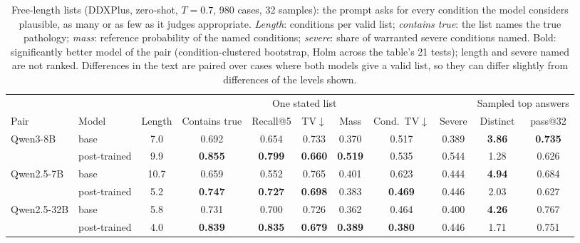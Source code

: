 \documentclass[11pt]{article}
\begin{document}
\begin{table}[t]
\centering\small
\setlength{\tabcolsep}{3.5pt}
\begin{adjustbox}{max width=\linewidth}
\begin{tabular}{llccccccccc}
\toprule
 & & \multicolumn{7}{c}{One stated list} & \multicolumn{2}{c}{Sampled top answers} \\
Pair & Model & Length & Contains true & Recall@5 & TV$\downarrow$ & Mass & Cond.\ TV$\downarrow$ & Severe & Distinct & pass@32 \\
\midrule
Qwen3-8B & base & 7.0 & 0.692 & 0.654 & 0.733 & 0.370 & 0.517 & 0.389 & \textbf{3.86} & \textbf{0.735} \\
 & post-trained & 9.9 & \textbf{0.855} & \textbf{0.799} & \textbf{0.660} & \textbf{0.519} & 0.535 & 0.544 & 1.28 & 0.626 \\
\midrule
Qwen2.5-7B & base & 10.7 & 0.659 & 0.552 & 0.765 & 0.401 & 0.623 & 0.444 & \textbf{4.94} & 0.684 \\
 & post-trained & 5.2 & \textbf{0.747} & \textbf{0.727} & \textbf{0.698} & 0.383 & \textbf{0.469} & 0.446 & 2.03 & 0.627 \\
\midrule
Qwen2.5-32B & base & 5.8 & 0.731 & 0.700 & 0.726 & 0.362 & 0.464 & 0.400 & \textbf{4.26} & 0.767 \\
 & post-trained & 4.0 & \textbf{0.839} & \textbf{0.835} & \textbf{0.679} & \textbf{0.389} & \textbf{0.380} & 0.446 & 1.71 & 0.751 \\
\bottomrule
\end{tabular}
\end{adjustbox}
\caption{Free-length lists (DDXPlus, zero-shot, $T{=}0.7$, 980 cases, 32 samples): the prompt asks for every condition the model considers plausible, as many or as few as it judges appropriate. \emph{Length}: conditions per valid list; \emph{contains true}: the list names the true pathology; \emph{mass}: reference probability of the named conditions; \emph{severe}: share of warranted severe conditions named. Bold: significantly better model of the pair (condition-clustered bootstrap, Holm across the table's 21 tests); length and severe named are not ranked. Differences in the text are paired over cases where both models give a valid list, so they can differ slightly from differences of the levels shown.}
\label{tab:freelen}
\end{table}
\end{document}
